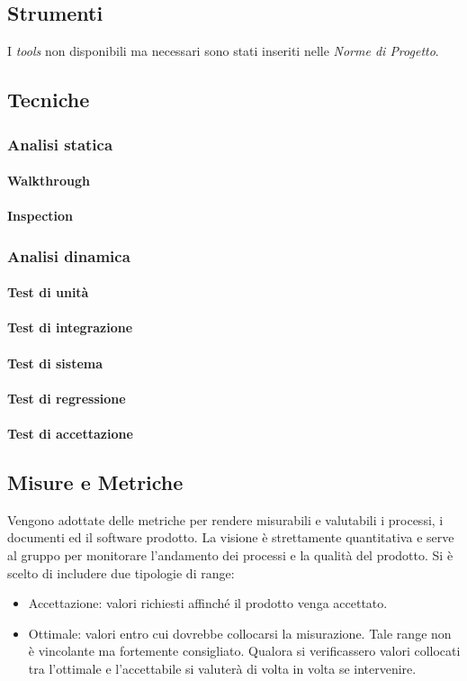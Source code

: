 	\subsection{Strumenti}
		I \emph{tools} non disponibili ma necessari sono stati inseriti nelle \emph{Norme di Progetto}. %
	
	\subsection{Tecniche}
		\subsubsection{Analisi statica}
			\paragraph{Walkthrough}
			\paragraph{Inspection}
		\subsubsection{Analisi dinamica}
			\paragraph{Test di unità}
			\paragraph{Test di integrazione}
			\paragraph{Test di sistema}
			\paragraph{Test di regressione}
			\paragraph{Test di accettazione}
	
	\subsection{Misure e Metriche}
	Vengono adottate delle metriche per rendere misurabili e valutabili i processi, i documenti ed il software prodotto. La visione è strettamente quantitativa e serve al gruppo per monitorare l'andamento dei processi e la qualità del prodotto. Si è scelto di includere due tipologie di range:
	\begin{itemize}
		\item Accettazione: valori richiesti affinché il prodotto venga accettato.
		\item Ottimale: valori entro cui dovrebbe collocarsi la misurazione. Tale range non è vincolante ma fortemente consigliato. Qualora si verificassero valori collocati tra l'ottimale e l'accettabile si valuterà di volta in volta se intervenire.
	\end{itemize}
		
